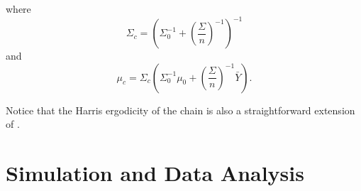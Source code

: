 \documentclass[graybox]{svmult}
\begin{document}
where $$\Sigma_{c} = \left( \Sigma^{-1}_0 + \left(\frac{\Sigma}{n} \right)^{-1}\right)^{-1}$$ and $$\mu_{c} = \Sigma_{c} \left( \Sigma_0^{-1} \mu_0 + \left(\frac{\Sigma}{n} \right)^{-1} \bar{Y} \right).$$

Notice that the Harris ergodicity of the chain is also a straightforward extension of \cite{khareBayesianApproachEnvelope2017}.

\section{Simulation and Data Analysis}


\end{document}
